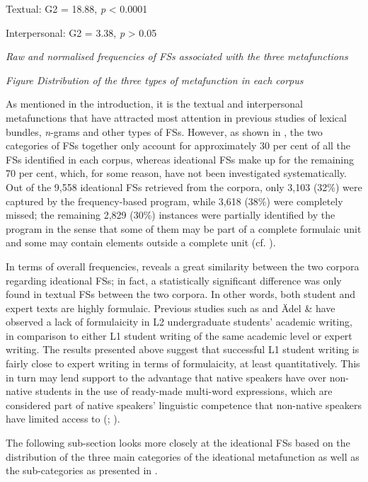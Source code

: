 \documentclass[output=paper]{langsci/langscibook}
\begin{document}
Textual: G2 = 18.88, \textit{p} < 0.0001

Interpersonal: G2 = 3.38, \textit{p} > 0.05

\textit{ Raw and normalised frequencies of FSs associated with the three metafunctions}

\begin{stylecaption}
\textmd{\textit{Figure  Distribution of the three types of metafunction in each corpus}}
\end{stylecaption}

As mentioned in the introduction, it is the textual and interpersonal metafunctions that have attracted most attention in previous studies of lexical bundles, \textit{n}{}-grams and other types of FSs. However, as shown in , the two categories of FSs together only account for approximately 30 per cent of all the FSs identified in each corpus, whereas ideational FSs make up for the remaining 70 per cent, which, for some reason, have not been investigated systematically. Out of the 9,558 ideational FSs retrieved from the corpora, only 3,103 (32\%) were captured by the frequency-based program, while 3,618 (38\%) were completely missed; the remaining 2,829 (30\%) instances were partially identified by the program in the sense that some of them may be part of a complete formulaic unit and some may contain elements outside a complete unit (cf. ). 

In terms of overall frequencies,  reveals a great similarity between the two corpora regarding ideational FSs; in fact, a statistically significant difference was only found in textual FSs between the two corpora. In other words, both student and expert texts are highly formulaic. Previous studies such as \citet{ChenBaker2010} and Ädel \& \citet{Erman2012} have observed a lack of formulaicity in L2 undergraduate students’ academic writing, in comparison to either L1 student writing of the same academic level or expert writing. The results presented above suggest that successful L1 student writing is fairly close to expert writing in terms of formulaicity, at least quantitatively. This in turn may lend support to the advantage that native speakers have over non-native students in the use of ready-made multi-word expressions, which are considered part of native speakers’ linguistic competence that non-native speakers have limited access to (\citealt{Wray2002,20082002}; \citealt{Kecskes2016}).  

The following sub-section looks more closely at the ideational FSs based on the distribution of the three main categories of the ideational metafunction as well as the sub-categories as presented in .
\end{document}

